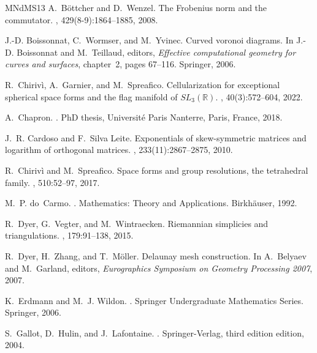 \documentclass[11pt,twoside]{amsart}
\theoremstyle{plain}
\begin{document}
\begin{thebibliography}{MNdMS13}
A.~B\"{o}ttcher and D.~Wenzel.
\newblock The {F}robenius norm and the commutator.
, 429(8-9):1864--1885, 2008.

J.-D. Boissonnat, C.~Wormser, and M.~Yvinec.
\newblock Curved voronoi diagrams.
\newblock In J.-D. Boissonnat and M.~Teillaud, editors, {\em Effective
  computational geometry for curves and surfaces}, chapter~2, pages 67--116.
  Springer, 2006.

R.~Chiriv\`{i}, A.~Garnier, and M.~Spreafico.
\newblock Cellularization for exceptional spherical space forms and the flag
  manifold of ${SL}_3(\mathbb{R})$.
, 40(3):572--604, 2022.

A.~Chapron.
.
\newblock PhD thesis, Universit\'e Paris Nanterre, Paris, France, 2018.

J.~R. Cardoso and F.~Silva Leite.
\newblock Exponentials of skew-symmetric matrices and logarithm of orthogonal
  matrices.
, 233(11):2867--2875, 2010.

R.~Chiriv\`{i} and M.~Spreafico.
\newblock Space forms and group resolutions, the tetrahedral family.
, 510:52--97, 2017.

M.~P. do~Carmo.
.
\newblock Mathematics: Theory and Applications. Birkh\"{a}user, 1992.

R.~Dyer, G.~Vegter, and M.~Wintraecken.
\newblock Riemannian simplicies and triangulations.
, 179:91--138, 2015.

R.~Dyer, H.~Zhang, and T.~M{\"o}ller.
\newblock Delaunay mesh construction.
\newblock In A.~Belyaev and M.~Garland, editors, {\em Eurographics Symposium on
  Geometry Processing 2007}, 2007.

K.~Erdmann and M.~J. Wildon.
.
\newblock Springer Undergraduate Mathematics Series. Springer, 2006.

S.~Gallot, D.~Hulin, and J.~Lafontaine.
.
\newblock Springer-Verlag, third edition edition, 2004.


\end{thebibliography}
\end{document}
